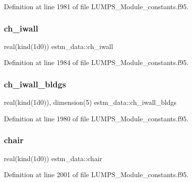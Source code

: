 Definition at line 1981 of file L\+U\+M\+P\+S\+\_\+\+Module\+\_\+constants.\+f95.

\mbox{\label{namespaceestm__data_a3e846940895fc9898d7493ae053dae26}} 
\subsubsection{\texorpdfstring{ch\+\_\+iwall}{ch\_iwall}}
{\footnotesize\ttfamily real(kind(1d0)) estm\+\_\+data\+::ch\+\_\+iwall}



Definition at line 1984 of file L\+U\+M\+P\+S\+\_\+\+Module\+\_\+constants.\+f95.

\mbox{\label{namespaceestm__data_a719d534316a73fc7012365ced77cfaa7}} 
\subsubsection{\texorpdfstring{ch\+\_\+iwall\+\_\+bldgs}{ch\_iwall\_bldgs}}
{\footnotesize\ttfamily real(kind(1d0)), dimension(5) estm\+\_\+data\+::ch\+\_\+iwall\+\_\+bldgs}



Definition at line 1980 of file L\+U\+M\+P\+S\+\_\+\+Module\+\_\+constants.\+f95.

\mbox{\label{namespaceestm__data_aa6d36cc9cf56237cb74ffdce30682dd7}} 
\subsubsection{\texorpdfstring{chair}{chair}}
{\footnotesize\ttfamily real(kind(1d0)) estm\+\_\+data\+::chair}



Definition at line 2001 of file L\+U\+M\+P\+S\+\_\+\+Module\+\_\+constants.\+f95.

\mbox{\label{namespaceestm__data_a4987b710091708bf51061f8edb66ce63}} 
